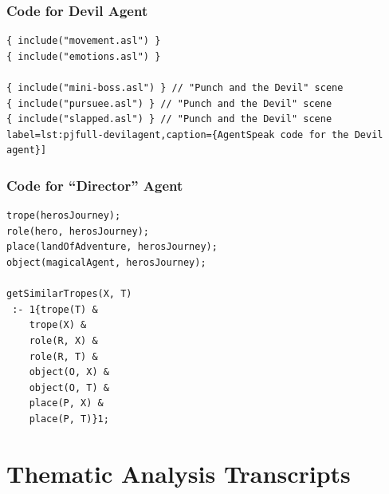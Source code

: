 \documentclass[11pt]{report}
\newif\ifdraft
\begin{document}
\subsection{Code for Devil Agent}
\begin{lstlisting}[showstringspaces=false,
label=lst:pjfull-devilagent,caption={AgentSpeak code for the Devil agent}]
{ include("movement.asl") }
{ include("emotions.asl") }

{ include("mini-boss.asl") } // "Punch and the Devil" scene
{ include("pursuee.asl") } // "Punch and the Devil" scene
{ include("slapped.asl") } // "Punch and the Devil" scene
label=lst:pjfull-devilagent,caption={AgentSpeak code for the Devil agent}]
\end{lstlisting}

\subsection{Code for ``Director'' Agent}

\begin{lstlisting}[showstringspaces=false,
label=lst:app-pjfull-diragent,caption={AgentSpeak code for the ``Director'' agent}]
trope(herosJourney);
role(hero, herosJourney);
place(landOfAdventure, herosJourney);
object(magicalAgent, herosJourney);

getSimilarTropes(X, T)
 :- 1{trope(T) &
    trope(X) &
    role(R, X) &
    role(R, T) &
    object(O, X) &
    object(O, T) &
    place(P, X) &
    place(P, T)}1;

\end{lstlisting}

\chapter{Thematic Analysis Transcripts}
\label{appendix:transcripts}

\ifdraft
\def\feature#1{\todo[disable,color=green,size=\scriptsize]{\textbf{Feature:} #1}}
\def\usability#1{\todo[disable,color=cyan,size=\scriptsize]{\textbf{Usability:} #1}}
\def\bug#1{\todo[disable,color=red,size=\scriptsize]{\textbf{Limitation:} #1}}
\def\syntax#1{\todo[disable,color=yellow,size=\scriptsize]{\textbf{Syntax:} #1}}
\else
\def\feature#1{\todo[color=green,size=\scriptsize]{\textbf{Feature:} #1}}
\def\usability#1{\todo[color=cyan,size=\scriptsize]{\textbf{Usability:} #1}}
\def\bug#1{\todo[color=red,size=\scriptsize]{\textbf{Limitation:} #1}}
\def\syntax#1{\todo[color=yellow,size=\scriptsize]{\textbf{Syntax:} #1}}
\fi
\end{document}
